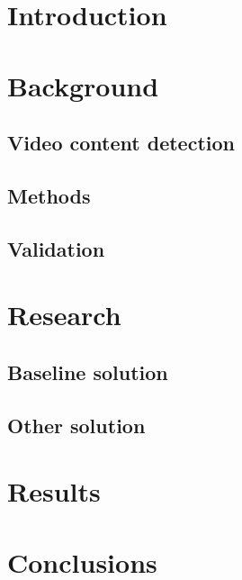 \section{Introduction} \label{sec:intro}

\section{Background} \label{sec:background}

\subsection{Video content detection} \label{subsec:detection}

\subsection{Methods} \label{subsec:methods}

\subsection{Validation} \label{subsec:validation}

\section{Research} \label{sec:research}

\subsection{Baseline solution} \label{subsec:baseline}

\subsection{Other solution} \label{subsec:solution}

\section{Results} \label{sec:results}

\section{Conclusions} \label{sec:conclusions}
